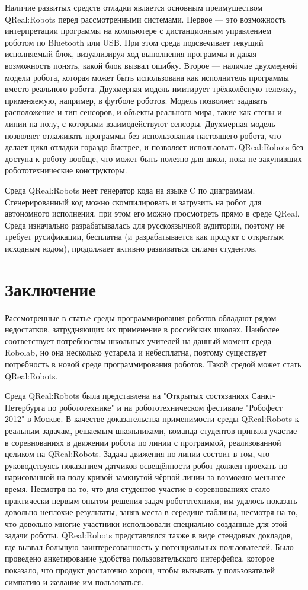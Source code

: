 \documentclass[a4paper]{article}
\begin{document}
Наличие развитых средств отладки является основным преимуществом QReal:Robots перед рассмотренными системами. Первое --- это возможность интерпретации программы на компьютере с дистанционным управлением роботом по Bluetooth или USB. При этом среда подсвечивает текущий исполняемый блок, визуализируя ход выполнения программы и давая возможность понять, какой блок вызвал ошибку. Второе --- наличие двухмерной модели робота, которая может быть использована как исполнитель программы вместо реального робота. Двухмерная модель имитирует трёхколёсную тележку, применяемую, например, в футболе роботов. Модель позволяет задавать расположение и тип сенсоров, и объекты реального мира, такие как стены и линии на полу, с которыми взаимодействуют сенсоры. Двухмерная модель позволяет отлаживать программы без использования настоящего робота, что делает цикл отладки гораздо быстрее, и позволяет использовать QReal:Robots без доступа к роботу вообще, что может быть полезно для школ, пока не закупивших робототехнические конструкторы.

Среда QReal:Robots иеет генератор кода на языке C по диаграммам. Сгенерированный код можно скомпилировать и загрузить на робот для автономного исполнения, при этом его можно просмотреть прямо в среде QReal. Среда изначально разрабатывалась для русскоязычной аудитории, поэтому не требует русификации, бесплатна (и разрабатывается как продукт с открытым исходным кодом), продолжает активно развиваться силами студентов.

\section*{Заключение}
Рассмотренные в статье среды программирования роботов обладают рядом недостатков, затрудняющих их применение в российских школах. Наиболее соответствует потребностям школьных учителей на данный момент среда Robolab, но она несколько устарела и небесплатна, поэтому существует потребность в новой среде программирования роботов. Такой средой может стать QReal:Robots.

Среда QReal:Robots была представлена на "Открытых состязаниях Санкт-Петербурга по робототехнике" и на робототехническом фестивале "Робофест 2012" в Москве. В качестве доказательства применимости среды QReal:Robots к реальным задачам, решаемым школьниками, команда студентов приняла участие в соревнованиях в движении робота по линии с программой, реализованной целиком на QReal:Robots. Задача движения по линии состоит в том, что руководствуясь показанием датчиков освещённости робот должен проехать по нарисованной на полу кривой замкнутой чёрной линии за возможно меньшее время. Несмотря на то, что для студентов участие в соревнованиях стало практически первым опытом решения задач робототехники, им удалось показать довольно неплохие результаты, заняв места в середине таблицы, несмотря на то, что довольно многие участники использовали специально созданные для этой задачи роботы. QReal:Robots представлялся также в виде стендовых докладов, где вызвал большую заинтересованность у потенциальных пользователей. Было проведено анкетирование удобства пользовательского интерфейса, которое показало, что продукт достаточно хорош, чтобы вызывать у пользователей симпатию и желание им пользоваться.
\end{document}
